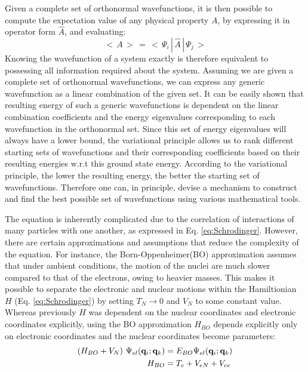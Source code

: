             Given a complete set of orthonormal wavefunctions, it is then possible to compute the expectation value of any physical property $A$, by expressing it in operator form $\hat{A}$, and evaluating:
            \begin{equation}\label{eq:expectation value}
                <\,A\,>\, =\, < \,\Psi_i\,|\,\hat{A}\,|\, \Psi_j\,>
            \end{equation}
            Knowing the wavefunction of a system exactly is therefore equivalent to possessing all information required about the system. Assuming we are given a complete set of orthonormal wavefunctions, we can express any generic wavefunction as a linear combination of the given set. It can be easily shown that resulting energy of such a generic wavefunctions is dependent on the linear combination coefficients and the energy eigenvalues corresponding to each wavefunction in the orthonormal set. Since this set of energy eigenvalues will always have a lower bound, the variational principle allows us to rank different starting sets of wavefunctions and their corresponding coefficients based on their resulting energies w.r.t this ground state energy. According to the variational principle, the lower the resulting energy, the better the starting set of wavefunctions. Therefore one can, in principle, devise a mechanism to construct and find the best possible set of wavefunctions using various mathematical tools.

            The \Schrodinger{} equation is inherently complicated due to the correlation of interactions of many particles with one another, as expressed in Eq. \eqref{eq:Schrodinger}. However, there are certain approximations and assumptions that reduce the complexity of the equation. For instance, the Born-Oppenheimer(BO) approximation assumes that under ambient conditions, the motion of the nuclei are much slower compared to that of the electrons, owing to heavier masses. This makes it possible to separate the electronic and nuclear motions within the Hamiltionian $H$ (Eq. \eqref{eq:Schrodinger}) by setting $T_N \to 0$ and $V_N$ to some constant value. Whereas previously $H$ was dependent on the nuclear coordinates and electronic coordinates explicitly, using the BO approximation $H_{BO}$ depends explicitly only on electronic coordinates and the nuclear coordinates become parameters:
            \begin{equation}\label{eq:BO approximation}
                \begin{aligned}
                    (H_{BO} + V_N)~\Psi_{el} ({\mathbf {q}}_i;{\mathbf {q}}_k) &= E_{BO} \Psi_{el} ({\mathbf {q}}_i;{\mathbf {q}}_k)\\
                    H_{BO} &= T_e + V_{eN} + V_{ee}
                \end{aligned}
            \end{equation}

